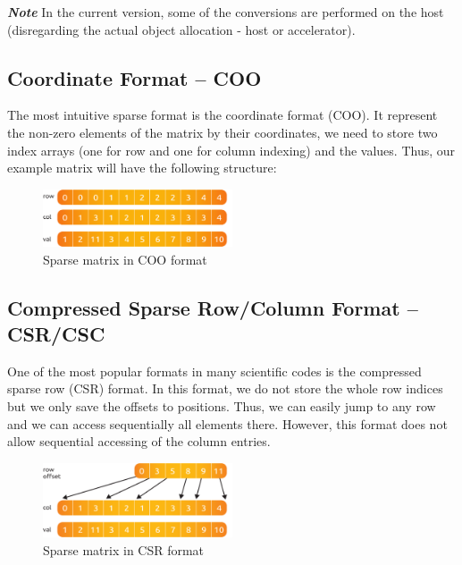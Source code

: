 \textbf{\emph{Note}} In the current version, some of the conversions are performed on the host (disregarding the actual object allocation - host or accelerator).




\subsection{Coordinate Format -- COO}

The most intuitive sparse format is the coordinate format (COO). It represent the non-zero elements of the matrix by their coordinates, we need to store two index arrays (one for row and one for column indexing) and the values. Thus, our example matrix will have the following structure:

\begin{figure}[!ht]
\centering
\includegraphics[width=0.5\textwidth]{./fig/mat/coo.pdf}
\caption{Sparse matrix in COO format}
\end{figure}

\subsection{Compressed Sparse Row/Column Format -- CSR/CSC}

One of the most popular formats in many scientific codes is the compressed sparse row (CSR) format. In this format, we do not store the whole row indices but we only save the offsets to positions. Thus, we can easily jump to any row and we can access sequentially all elements there. However, this format does not allow sequential accessing of the column entries.

\begin{figure}[!ht]
\centering
\includegraphics[width=0.5\textwidth]{./fig/mat/csr.pdf}
\caption{Sparse matrix in CSR format}
\end{figure}

